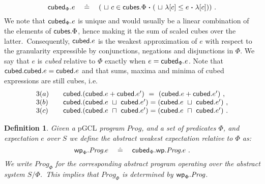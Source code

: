 \documentclass[numbers,copyright,creativecommons]{eptcs}
\newcommand{\cubes}{\mbox{\sf cubes}}
\newcommand{\cubed}{\mbox{\sf cubed}}
\newcommand{\Wp}{\mbox{\sf wp}}
\newcommand{\Min}{~\sqcap~}
\newcommand{\Max}{~\sqcup~}
\newcommand{\pGCL}{\mbox{pGCL}}
\newcommand{\Prog}{\textit{Prog}}
\newcommand{\IE}{\textrm{i.e.}}
\newcommand{\CompNY}[3]{(#1#2 \Spot #3)}
\newcommand{\Spot}{\mathrel{\mbox{\boldmath$\cdot$}}}
\newcommand{\Defs}{\mathrel{\hat{=}}}
\newcommand{\Wide}[1]{~~~#1~~~}
\newtheorem{Defns}{Definition}\newtheorem{Corl}{Corollary}\newcommand{\Def}[1]{Def.~\ref{#1}}
\begin{document}
\begin{equation}\label{e0722}
\cubed_\Phi.e \Wide{\Defs}  \CompNY{\Max}{c\in \cubes.\Phi} {\CompNY{\Max}{\lambda [c] \leq e}  {\lambda [c]}}~.
\end{equation}
We note that $\cubed_\Phi.e$ is unique and would usually be a linear combination of the elements of $\cubes.\Phi$, hence making it the sum of scaled cubes over the latter.\ Consequently, $\cubed.e$ is the weakest approximation of $e$ with respect to the granularity expressible by conjunctions, negations and disjunctions in $\Phi$.
We say that $e$ is \emph{cubed} relative to $\Phi$ exactly when $\mathord{e = \cubed_\Phi.e}$. Note that $\mathord{\cubed.\cubed.e = \cubed.e}$ and
that  sums, maxima and minima of cubed expressions are still cubes, \IE\
\[
\begin{array}{ll}
3(a)~~~ & \cubed.(\cubed.e + \cubed.e') \  =  \ (\cubed.e + \cubed.e')~, \\

3(b)~~~ &  \cubed.(\cubed.e \Max \cubed.e') = (\cubed.e \Max \cubed.e')~, \\

3(c)~~~ &  \cubed.(\cubed.e \Min \cubed.e') = (\cubed.e \Min \cubed.e') ~. \\

\end{array}
\]




\begin{Defns}\label{d1822}
Given a $\pGCL$ program $\Prog$, and a set of predicates $\Phi$, and expectation $e$ over $S$ we define the abstract weakest expectation relative to $\Phi$ as:
\[
\Wp_\Phi.\Prog.e \Wide{\Defs} \cubed_\Phi. \Wp.\Prog.e~.
\]
We write $\Prog_\Phi$ for the corresponding abstract program operating over the abstract system $S/\Phi$.\ This implies that
$Prog_{\Phi}$ is determined by $\Wp_\Phi.\Prog$.
\end{Defns}
\end{document}
